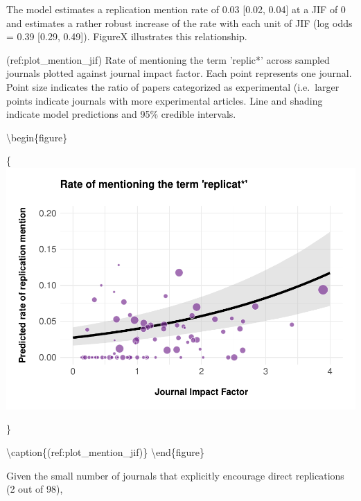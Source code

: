 \documentclass[]{elsarticle} %
\begin{document}
The model estimates a replication mention rate of 0.03 {[}0.02, 0.04{]}
at a JIF of 0 and estimates a rather robust increase of the rate with
each unit of JIF (log odds = 0.39 {[}0.29, 0.49{]}). FigureX illustrates
this relationship.

(ref:plot\_mention\_jif) Rate of mentioning the term 'replic*' across
sampled journals plotted against journal impact factor. Each point
represents one journal. Point size indicates the ratio of papers
categorized as experimental (i.e.~larger points indicate journals with
more experimental articles. Line and shading indicate model predictions
and 95\% credible intervals.

\textbackslash begin\{figure\}

\{\centering \includegraphics[width=1\linewidth]{ReplicationLing_files/figure-latex/plot_mention_jif-1}

\}

\textbackslash caption\{(ref:plot\_mention\_jif)\}\label{fig:plot_mention_jif}
\textbackslash end\{figure\}

Given the small number of journals that explicitly encourage direct
replications (2 out of 98),
\end{document}
